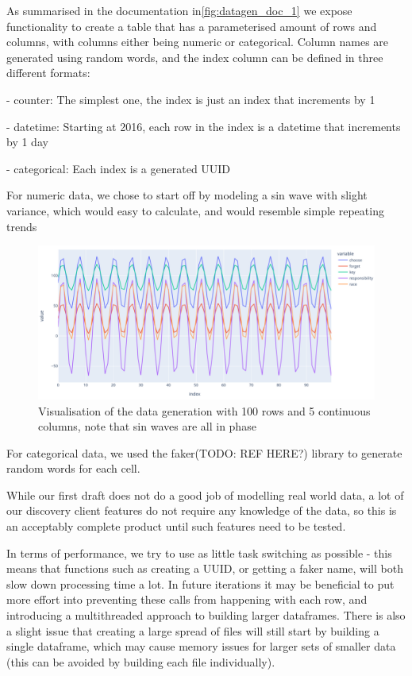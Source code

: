 As summarised in the documentation in\ref{fig:datagen_doc_1} we expose functionality to create a table that has a
parameterised amount of rows and columns, with columns either being numeric or categorical.
Column names are generated using random words, and the index column can be defined in three different formats:

- counter: The simplest one, the index is just an index that increments by 1

- datetime: Starting at 2016, each row in the index is a datetime that increments by 1 day

- categorical: Each index is a generated UUID

For numeric data, we chose to start off by modeling a sin wave with slight variance, which would easy to calculate, and
would resemble simple repeating trends

\begin{figure}[h]
    \centering
    \includegraphics[width=12cm]{figures/data_generation/fake_data_gen_continuous_1}
    \caption{Visualisation of the data generation with 100 rows and 5 continuous columns, note that sin waves are all in phase}
    \label{fig:datagen_fig_1}
\end{figure}

For categorical data, we used the faker(TODO: REF HERE?) library to generate random words for each cell.

While our first draft does not do a good job of modelling real world data, a lot of our discovery client features do not
require any knowledge of the data, so this is an acceptably complete product until such features need to be tested.

In terms of performance, we try to use as little task switching as possible - this means that functions such as creating
a UUID, or getting a faker name, will both slow down processing time a lot.
In future iterations it may be beneficial to put more effort into preventing these calls from happening with each row,
and introducing a multithreaded approach to building larger dataframes.
There is also a slight issue that creating a large spread of files will still start by building a single dataframe, which
may cause memory issues for larger sets of smaller data (this can be avoided by building each file individually).

